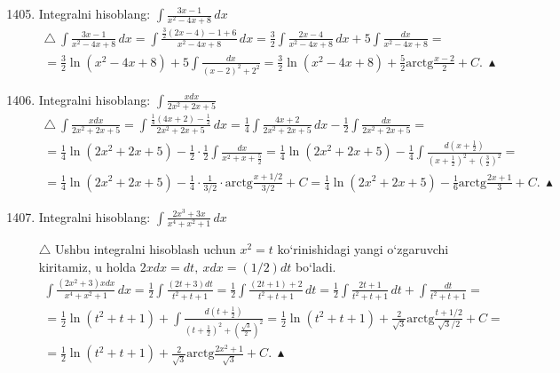 \begin{enumerate}\setcounter{enumi}{1404}
	
	\item Integralni hisoblang: $\int\frac{3x-1}{x^2-4x+8}\,dx$
	\begin{multline*}
		\triangle\ \int\frac{3x-1}{x^2-4x+8}\,dx=\int\frac{\frac{3}{2}(2x-4)-1+6}{x^2-4x+8}\,dx=\frac{3}{2}\int\frac{2x-4}{x^2-4x+8}\,dx+5\int\frac{dx}{x^2-4x+8}=\\
		=\frac{3}{2}\ln(x^2-4x+8)
		+5\int\frac{dx}{(x-2)^2+2^2}=\frac{3}{2}\ln(x^2-4x+8)+\frac{5}{2}\mbox{arctg}\frac{x-2}{2}+C.\ \blacktriangle
	\end{multline*}
	
	\item Integralni hisoblang: $\int\frac{xdx}{2x^2+2x+5}$
	\begin{multline*}
		\triangle\ \int\frac{xdx}{2x^2+2x+5}=\int\frac{\frac{1}{4}(4x+2)-\frac{1}{2}}{2x^2+2x+5}\,dx=\frac{1}{4}\int\frac{4x+2}{2x^2+2x+5}\,dx-\frac{1}{2}\int\frac{dx}{2x^2+2x+5}=\\
		=\frac{1}{4}\ln(2x^2+2x+5)-\frac{1}{2}\cdot\frac{1}{2}\int\frac{dx}{x^2+x+\frac{5}{2}}=\frac{1}{4}\ln(2x^2+2x+5)-\frac{1}{4}\int\frac{d\left(x+\frac{1}{2}\right)}{\left(x+\frac{1}{2}\right)^2+
			\left(\frac{3}{2}\right)^2 } =\\
		=\frac{1}{4}\ln(2x^2+2x+5)-\frac{1}{4}\cdot\frac{1}{3/2}\cdot\mbox{arctg}\frac{x+1/2}{3/2}+C=\frac{1}{4}\ln(2x^2+2x+5)-\frac{1}{6}\mbox{arctg}\frac{2x+1}{3}+C.\ \blacktriangle		
	\end{multline*}
\item Integralni hisoblang: $\int\frac{2x^3+3x}{x^4+x^2+1}\,dx$

$\triangle$ Ushbu integralni hisoblash uchun $x^2=t$ ko`rinishidagi yangi o`zgaruvchi kiritamiz, u holda $2xdx=dt,\ xdx=(1/2)dt$ bo`ladi. 
\begin{multline*}
	\int\frac{(2x^2+3)xdx}{x^4+x^2+1}\,dx=\frac{1}{2}\int\frac{(2t+3)dt}{t^2+t+1}=\frac{1}{2}\int\frac{(2t+1)+2}{t^2+t+1}\,dt=\frac{1}{2}\int\frac{2t+1}{t^2+t+1}\,dt+\int\frac{dt}{t^2+t+1}=\\
	=\frac{1}{2}\ln(t^2+t+1)+\int\frac{d\left(t+\frac{1}{2}\right)}
	{\left( t+\frac{1}{2}\right)^2+\left( \frac{\sqrt{3}}{2}\right)^2}=\frac{1}{2}\ln(t^2+t+1)+\frac{2}{\sqrt{3}}\mbox{arctg}\frac{t+1/2}{\sqrt{3}/2}+C=\\
	=\frac{1}{2}\ln(t^2+t+1)+\frac{2}{\sqrt{3}}\mbox{arctg}\frac{2x^2+1}{\sqrt{3}}+C.\ \blacktriangle
\end{multline*}
\end{enumerate}
